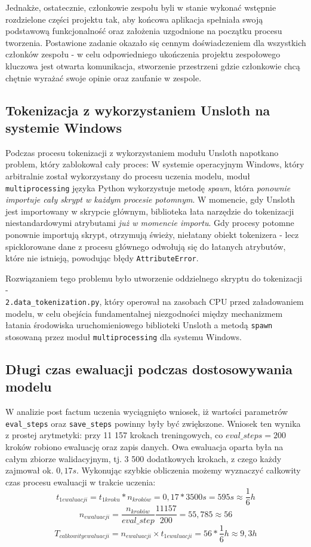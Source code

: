 \documentclass[12pt,a4paper]{article}
\begin{document}
Jednakże, ostatecznie, członkowie zespołu byli w stanie wykonać wstępnie rozdzielone części projektu tak, aby końcowa aplikacja spełniała swoją podstawową funkcjonalność oraz założenia uzgodnione na początku procesu tworzenia. Postawione zadanie okazało się cennym doświadczeniem dla wszystkich członków zespołu - w celu odpowiedniego ukończenia projektu zespołowego kluczowa jest otwarta komunikacja, stworzenie przestrzeni gdzie członkowie chcą chętnie wyrażać swoje opinie oraz zaufanie w zespole.

\subsection{Tokenizacja z wykorzystaniem Unsloth na systemie Windows}
\label{ssec:problem_tokenization}

Podczas procesu tokenizacji z wykorzystaniem modułu Unsloth napotkano problem, który zablokował cały proces:
W systemie operacyjnym Windows, który arbitralnie został wykorzystany do procesu uczenia modelu,  moduł \texttt{multiprocessing} języka Python wykorzystuje metodę
\emph{spawn}, która \emph{ponownie importuje cały skrypt w każdym procesie potomnym}. W momencie, gdy Unsloth jest importowany w skrypcie głównym, 
biblioteka łata narzędzie do tokenizacji niestandardowymi atrybutami \emph{już w momencie importu}. Gdy procesy potomne ponownie importują skrypt,
otrzymują świeży, niełatany obiekt tokenizera - lecz spicklorowane dane z procesu głównego odwołują się do łatanych atrybutów, które nie istnieją, powodując błędy
\texttt{AttributeError}.

Rozwiązaniem tego problemu było utworzenie oddzielnego skryptu do tokenizacji -\\    \texttt{2.data\_tokenization.py}, który operował na zasobach CPU przed załadowaniem modelu, 
w celu obejścia fundamentalnej niezgodności między mechanizmem łatania środowiska uruchomieniowego biblioteki Unsloth a metodą \texttt{spawn} stosowaną przez moduł 
\texttt{multiprocessing} dla systemu Windows.

\subsection{Długi czas ewaluacji podczas dostosowywania modelu}
\label{ssec:problem_long_eval}

W analizie post factum uczenia wyciągnięto wniosek, iż wartości parametrów \texttt{eval\_steps} oraz \texttt{save\_steps} powinny były być zwiększone.
Wniosek ten wynika z prostej arytmetyki: przy 11 157 krokach treningowych, co $ eval\_steps = 200 $ kroków robiono ewaluację oraz zapis danych. Owa ewaluacja oparta była na 
całym zbiorze walidacyjnym, tj. 3 500 dodatkowych krokach, z czego każdy zajmował ok. $0,17 s$. Wykonując szybkie obliczenia możemy wyznaczyć całkowity czas 
procesu ewaluacji w trakcie uczenia:
$$ t_{1 ewaluacji} = t_{1 kroku} * n_{kroków} = 0,17*3500s = 595s \approx \frac{1}{6}h $$ 
$$ n_{ewaluacji} = \frac{n_{kroków}}{eval\_step}\frac{11157}{200} = 55,785 \approx 56 $$  
$$ T_{całkowity ewaluacji} = n_{ewaluacji} \times t_{1 ewaluacji} = 56 * \frac{1}{6}h \approx 9,3h  $$
\end{document}
